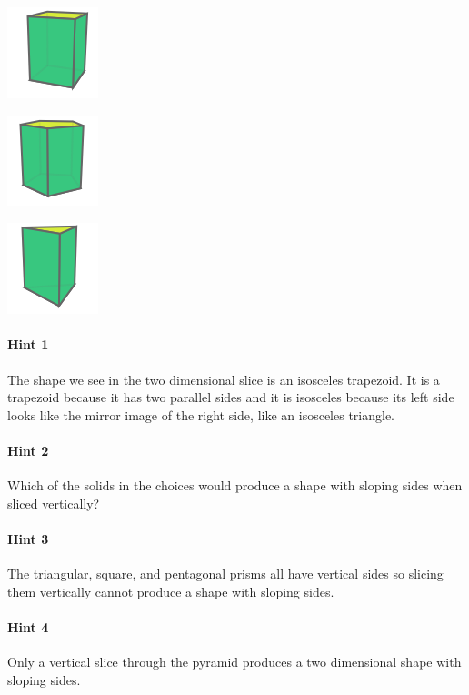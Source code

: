 \documentclass[twocolumn,10pt]{article}
\def\shrinkfactor{0.4}
\begin{document}
 
\includegraphics[scale=\shrinkfactor]{figures/5f94871e71f674049268d58ac56b3de4dfa3a3ba.png}


\includegraphics[scale=\shrinkfactor]{figures/714aa411c23dfb02df032183d703d78050ecb5ae.png}


\includegraphics[scale=\shrinkfactor]{figures/df7e52cb3a541015199076ff457ee6bdda3a663c.png}



\paragraph{Hint 1}The shape we see in the two dimensional slice is an isosceles trapezoid. It is a trapezoid because it has two parallel sides and it is isosceles because its left side looks like the mirror image of the right side, like an isosceles triangle.

\paragraph{Hint 2}Which of the solids in the choices would produce a shape with sloping sides when sliced vertically?

\paragraph{Hint 3}The triangular, square, and pentagonal prisms all have vertical sides so slicing them vertically cannot produce a shape with sloping sides.

\paragraph{Hint 4}Only a vertical slice through the pyramid produces a two dimensional shape with sloping sides.
\end{document}
